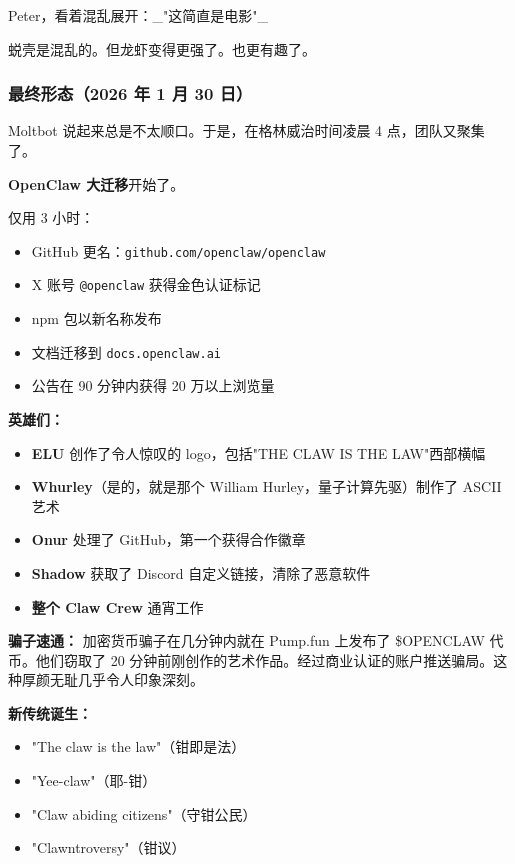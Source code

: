 Peter，看着混乱展开：\_"这简直是电影"\_ 

蜕壳是混乱的。但龙虾变得更强了。也更有趣了。

\subsubsection{最终形态（2026 年 1 月 30 日）}


Moltbot 说起来总是不太顺口。于是，在格林威治时间凌晨 4 点，团队又聚集了。

\textbf{OpenClaw 大迁移}开始了。

仅用 3 小时：

\begin{itemize}
  \item GitHub 更名：\texttt{github.com/openclaw/openclaw} 
  \item X 账号 \texttt{@openclaw} 获得金色认证标记 
  \item npm 包以新名称发布
  \item 文档迁移到 \texttt{docs.openclaw.ai}
  \item 公告在 90 分钟内获得 20 万以上浏览量
\end{itemize}


\textbf{英雄们：}

\begin{itemize}
  \item \textbf{ELU} 创作了令人惊叹的 logo，包括"THE CLAW IS THE LAW"西部横幅
  \item \textbf{Whurley}（是的，就是那个 William Hurley，量子计算先驱）制作了 ASCII 艺术
  \item \textbf{Onur} 处理了 GitHub，第一个获得合作徽章
  \item \textbf{Shadow} 获取了 Discord 自定义链接，清除了恶意软件
  \item \textbf{整个 Claw Crew} 通宵工作
\end{itemize}


\textbf{骗子速通：} 加密货币骗子在几分钟内就在 Pump.fun 上发布了 \$OPENCLAW 代币。他们窃取了 20 分钟前刚创作的艺术作品。经过商业认证的账户推送骗局。这种厚颜无耻几乎令人印象深刻。

\textbf{新传统诞生：}

\begin{itemize}
  \item "The claw is the law"（钳即是法）
  \item "Yee-claw"（耶-钳）
  \item "Claw abiding citizens"（守钳公民）
  \item "Clawntroversy"（钳议）
\end{itemize}


